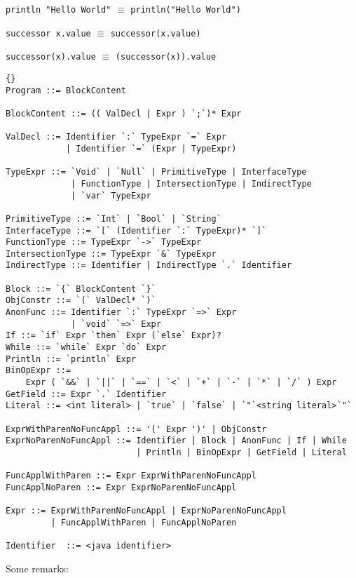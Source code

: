 \documentclass[12pt, draft]{article}
\begin{document}
\texttt{println "Hello World"} $\equiv$ \texttt{println("Hello World")} 

\texttt{successor x.value} $\equiv$ \texttt{successor(x.value)} 

\texttt{successor(x).value} $\equiv$ \texttt{(successor(x)).value} 

\hspace{0.4cm}

\begin{lstlisting}[float,caption={Grammar of the basic phase I language},captionpos=b]{}
Program ::= BlockContent

BlockContent ::= (( ValDecl | Expr ) `;`)* Expr

ValDecl ::= Identifier `:` TypeExpr `=` Expr
            | Identifier `=` (Expr | TypeExpr)

TypeExpr ::= `Void` | `Null` | PrimitiveType | InterfaceType 
             | FunctionType | IntersectionType | IndirectType
             | `var` TypeExpr

PrimitiveType ::= `Int` | `Bool` | `String`
InterfaceType ::= `[` (Identifier `:` TypeExpr)* `]`
FunctionType ::= TypeExpr `->` TypeExpr
IntersectionType ::= TypeExpr `&` TypeExpr
IndirectType ::= Identifier | IndirectType `.` Identifier

Block ::= `{` BlockContent `}`
ObjConstr ::= `(` ValDecl* `)`
AnonFunc ::= Identifier `:` TypeExpr `=>` Expr
             | `void` `=>` Expr
If ::= `if` Expr `then` Expr (`else` Expr)?
While ::= `while` Expr `do` Expr
Println ::= `println` Expr
BinOpExpr ::= 
    Expr ( `&&` | `||` | `==` | `<` | `+` | `-` | `*` | `/` ) Expr
GetField ::= Expr `.` Identifier
Literal ::= <int literal> | `true` | `false` | `"`<string literal>`"`

ExprWithParenNoFuncAppl ::= '(' Expr ')' | ObjConstr 
ExprNoParenNoFuncAppl ::= Identifier | Block | AnonFunc | If | While 
                          | Println | BinOpExpr | GetField | Literal

FuncApplWithParen ::= Expr ExprWithParenNoFuncAppl
FuncApplNoParen ::= Expr ExprNoParenNoFuncAppl

Expr ::= ExprWithParenNoFuncAppl | ExprNoParenNoFuncAppl 
         | FuncApplWithParen | FuncApplNoParen

Identifier	::=	<java identifier>
\end{lstlisting}


Some remarks:
\end{document}
